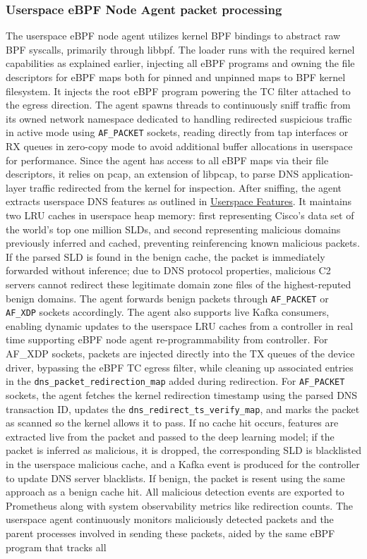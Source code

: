 \documentclass [11pt, proquest] {uwthesis}[2020/02/24]
\begin{document}
\subsubsection{\textbf{Userspace eBPF Node Agent packet processing}}
\label{active:sec2}
The userspace eBPF node agent utilizes kernel BPF bindings to abstract raw BPF syscalls, primarily through libbpf. The loader runs with the required kernel capabilities as explained earlier, injecting all eBPF programs and owning the file descriptors for eBPF maps both for pinned and unpinned maps to BPF kernel filesystem. It injects the root eBPF program powering the TC filter attached to the egress direction. The agent spawns threads to continuously sniff traffic from its owned network namespace dedicated to handling redirected suspicious traffic in active mode using \texttt{AF\_PACKET} sockets, reading directly from tap interfaces or RX queues in zero-copy mode to avoid additional buffer allocations in userspace for performance. Since the agent has access to all eBPF maps via their file descriptors, it relies on pcap, an extension of libpcap, to parse DNS application-layer traffic redirected from the kernel for inspection. After sniffing, the agent extracts userspace DNS features as outlined in \hyperref[sec:feature-userspace]{Userspace Features}. It maintains two LRU caches in userspace heap memory: first representing Cisco's data set of the world's top one million SLDs, and second representing malicious domains previously inferred and cached, preventing reinferencing known malicious packets. If the parsed SLD is found in the benign cache, the packet is immediately forwarded without inference; due to DNS protocol properties, malicious C2 servers cannot redirect these legitimate domain zone files of the highest-reputed benign domains. The agent forwards benign packets through \texttt{AF\_PACKET} or \texttt{AF\_XDP} sockets accordingly. The agent also supports live Kafka consumers, enabling dynamic updates to the userspace LRU caches from a controller in real time supporting eBPF node agent re-programmability from controller. For AF\_XDP sockets, packets are injected directly into the TX queues of the device driver, bypassing the eBPF TC egress filter, while cleaning up associated entries in the \texttt{dns\_packet\_redirection\_map} added during redirection. For \texttt{AF\_PACKET} sockets, the agent fetches the kernel redirection timestamp using the parsed DNS transaction ID, updates the \texttt{dns\_redirect\_ts\_verify\_map}, and marks the packet as scanned so the kernel allows it to pass. If no cache hit occurs, features are extracted live from the packet and passed to the deep learning model; if the packet is inferred as malicious, it is dropped, the corresponding SLD is blacklisted in the userspace malicious cache, and a Kafka event is produced for the controller to update DNS server blacklists. If benign, the packet is resent using the same approach as a benign cache hit. All malicious detection events are exported to Prometheus along with system observability metrics like redirection counts. The userspace agent continuously monitors maliciously detected packets and the parent processes involved in sending these packets, aided by the same eBPF program that tracks all 
\end{document}
